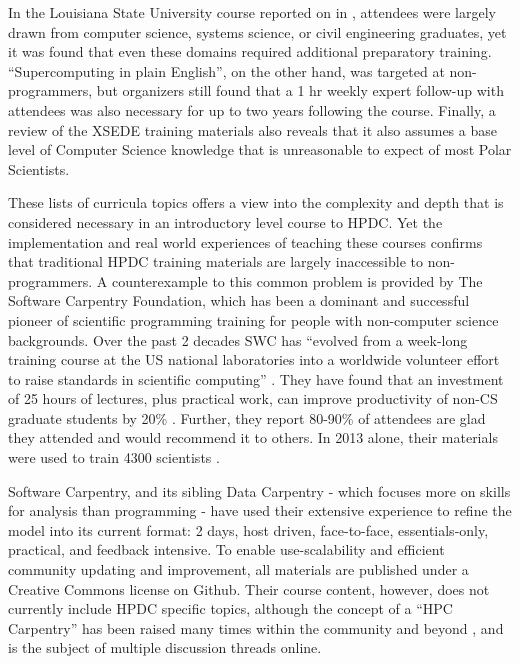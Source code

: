 \documentclass[conference]{IEEEtran}
\begin{document}
In the Louisiana State University course reported on in \cite{Allen2011-qx}, attendees were largely drawn from computer science, systems science, or civil engineering graduates, yet it was found that even these domains required additional preparatory training. ``Supercomputing in plain English'', on the other hand, was targeted at non-programmers, but organizers still found that a 1 hr weekly expert follow-up with attendees was also necessary for up to two years following the course.  Finally, a review of the XSEDE training materials also reveals that it also assumes a base level of Computer Science knowledge that is unreasonable to expect of most Polar Scientists.

These lists of curricula topics offers a view into the complexity and depth that is considered necessary in an introductory level course to HPDC. Yet the implementation and real world experiences of teaching these courses confirms that traditional HPDC training materials are largely inaccessible to non-programmers. A counterexample to this common problem is provided by The Software Carpentry Foundation, which has been a dominant and successful pioneer of scientific programming training for people with non-computer science backgrounds. Over the past 2 decades SWC has ``evolved from a week-long training course at the US national laboratories into a worldwide volunteer effort to raise standards in scientific computing'' \cite{Wilson2014-pc}. They have found that an investment of 25 hours of lectures, plus practical work, can improve productivity of non-CS graduate students by 20\% \cite{Wilson_undated-yk}. Further, they report 80-90\% of attendees are glad they attended and would recommend it to others. In 2013 alone, their materials were used to train 4300 scientists \cite{Wilson2014-pc}.

Software Carpentry, and its sibling Data Carpentry\cite{Mimno2016-cw} - which focuses more on skills for analysis than programming - have used their extensive experience to refine the model into its current format: 2 days, host driven, face-to-face, essentials-only, practical, and feedback intensive. To enable use-scalability and efficient community updating and improvement, all materials are published under a Creative Commons license on Github.  Their course content, however, does not currently include HPDC specific topics, although the concept of a “HPC Carpentry” has been raised many times within the community \cite{Datacarpentry_undated-zl} and beyond \cite{noauthor_undated-zw}, and is the subject of multiple discussion threads online. 
\end{document}
